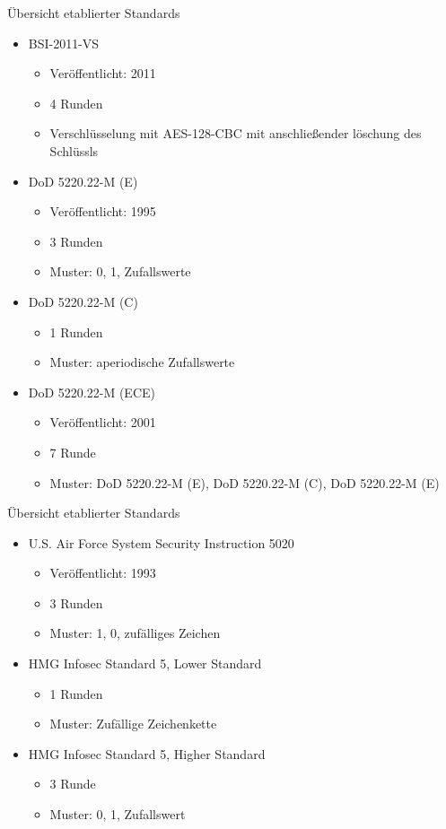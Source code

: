 \documentclass[aspectratio=169]{beamer}
\begin{document}
\begin{frame}{Übersicht etablierter Standards}
	\begin{itemize}
		\item BSI-2011-VS	
			\begin{itemize}
				\item Veröffentlicht: 2011
				\item 4 Runden
				\item Verschlüsselung mit AES-128-CBC mit anschließender
					löschung des Schlüssls
			\end{itemize}
		\item DoD 5220.22-M (E)
			\begin{itemize}
				\item Veröffentlicht: 1995
				\item 3 Runden
				\item Muster: 0, 1, Zufallswerte
			\end{itemize}
		\item DoD 5220.22-M (C)
			\begin{itemize}
				\item 1 Runden
				\item Muster: aperiodische Zufallswerte
			\end{itemize}
		\item DoD 5220.22-M (ECE)
			\begin{itemize}
				\item Veröffentlicht: 2001
				\item 7 Runde
				\item Muster: DoD 5220.22-M (E), DoD 5220.22-M (C),
					DoD 5220.22-M (E)
			\end{itemize}
	\end{itemize}
\end{frame}

\begin{frame}{Übersicht etablierter Standards}
	\begin{itemize}
		\item U.S. Air Force System Security Instruction 5020
			\begin{itemize}
				\item Veröffentlicht: 1993
				\item 3 Runden
				\item Muster: 1, 0, zufälliges Zeichen
			\end{itemize}
		\item HMG Infosec Standard 5, Lower Standard	
			\begin{itemize}
				\item 1 Runden
				\item Muster: Zufällige Zeichenkette
			\end{itemize}
		\item HMG Infosec Standard 5, Higher Standard	
			\begin{itemize}
				\item 3 Runde
				\item Muster: 0, 1, Zufallswert
			\end{itemize}
	\end{itemize}
\end{frame}
\end{document}
